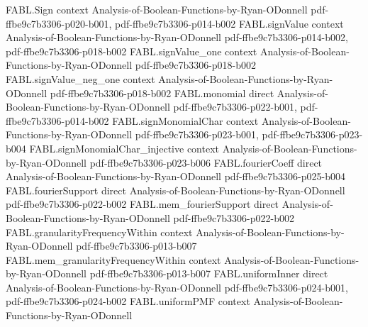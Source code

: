 \begin{theorem}
\label{FABL.FiniteFourierBasis.fourierCoeff_orthogonalDegreePart}
\leanok
{}
\proofstep
  {FABL.Sign}
  {context}
  {Analysis-of-Boolean-Functions-by-Ryan-ODonnell}
  {pdf-ffbe9c7b3306-p020-b001,
    pdf-ffbe9c7b3306-p014-b002}
\proofstep
  {FABL.signValue}
  {context}
  {Analysis-of-Boolean-Functions-by-Ryan-ODonnell}
  {pdf-ffbe9c7b3306-p014-b002,
    pdf-ffbe9c7b3306-p018-b002}
\proofstep
  {FABL.signValue_one}
  {context}
  {Analysis-of-Boolean-Functions-by-Ryan-ODonnell}
  {pdf-ffbe9c7b3306-p018-b002}
\proofstep
  {FABL.signValue_neg_one}
  {context}
  {Analysis-of-Boolean-Functions-by-Ryan-ODonnell}
  {pdf-ffbe9c7b3306-p018-b002}
\proofstep
  {FABL.monomial}
  {direct}
  {Analysis-of-Boolean-Functions-by-Ryan-ODonnell}
  {pdf-ffbe9c7b3306-p022-b001,
    pdf-ffbe9c7b3306-p014-b002}
\proofstep
  {FABL.signMonomialChar}
  {context}
  {Analysis-of-Boolean-Functions-by-Ryan-ODonnell}
  {pdf-ffbe9c7b3306-p023-b001,
    pdf-ffbe9c7b3306-p023-b004}
\proofstep
  {FABL.signMonomialChar_injective}
  {context}
  {Analysis-of-Boolean-Functions-by-Ryan-ODonnell}
  {pdf-ffbe9c7b3306-p023-b006}
\proofstep
  {FABL.fourierCoeff}
  {direct}
  {Analysis-of-Boolean-Functions-by-Ryan-ODonnell}
  {pdf-ffbe9c7b3306-p025-b004}
\proofstep
  {FABL.fourierSupport}
  {direct}
  {Analysis-of-Boolean-Functions-by-Ryan-ODonnell}
  {pdf-ffbe9c7b3306-p022-b002}
\proofstep
  {FABL.mem_fourierSupport}
  {direct}
  {Analysis-of-Boolean-Functions-by-Ryan-ODonnell}
  {pdf-ffbe9c7b3306-p022-b002}
\proofstep
  {FABL.granularityFrequencyWithin}
  {context}
  {Analysis-of-Boolean-Functions-by-Ryan-ODonnell}
  {pdf-ffbe9c7b3306-p013-b007}
\proofstep
  {FABL.mem_granularityFrequencyWithin}
  {context}
  {Analysis-of-Boolean-Functions-by-Ryan-ODonnell}
  {pdf-ffbe9c7b3306-p013-b007}
\proofstep
  {FABL.uniformInner}
  {direct}
  {Analysis-of-Boolean-Functions-by-Ryan-ODonnell}
  {pdf-ffbe9c7b3306-p024-b001,
    pdf-ffbe9c7b3306-p024-b002}
\proofstep
  {FABL.uniformPMF}
  {context}
  {Analysis-of-Boolean-Functions-by-Ryan-ODonnell}

\end{theorem}
